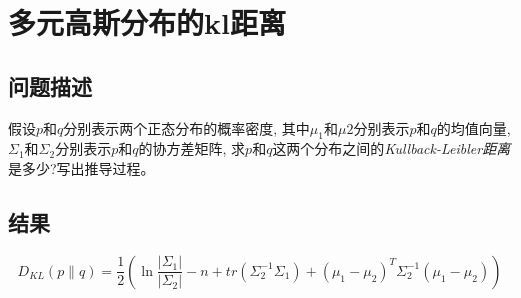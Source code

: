 \documentclass[UTF8,a4paper]{ctexart}
\begin{document}
  \section*{多元高斯分布的kl距离}

  \subsection{问题描述}
    假设$p$和$q$分别表示两个正态分布的概率密度,
    其中$\mu_1$和$\mu2$分别表示$p$和$q$的均值向量,
    $\Sigma_1$和$\Sigma_2$分别表示$p$和$q$的协方差矩阵,
    求$p$和$q$这两个分布之间的\emph{Kullback-Leibler距离}
    是多少?写出推导过程。

  \subsection{结果}
      \[ D_{KL}\left( p\|q \right ) =
        \frac{1}{2} \left( \ln \frac{\left| \Sigma_1 \right|}{\left| \Sigma_2 \right|} - n
        +
        tr
          \left(
              \Sigma_2^{-1}\Sigma_1
          \right)
        +
          \left( \mu_1 - \mu_2 \right)^T\Sigma_2^{-1}\left( \mu_1 - \mu_2 \right)
        \right)
      \]
\end{document}

